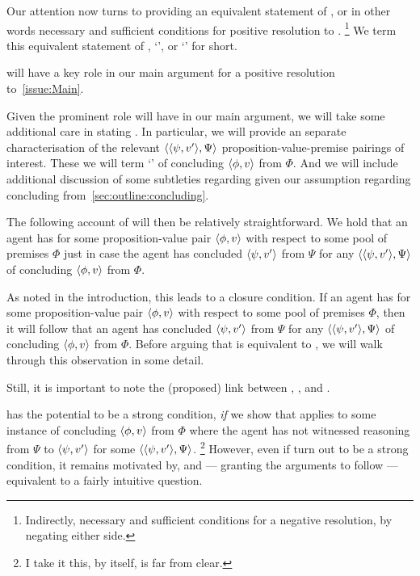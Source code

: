 \begin{note}
  Our attention now turns to providing an equivalent statement of \zs{}, or in other words necessary and sufficient conditions for positive resolution to \qzs{}.%
  \footnote{
    Indirectly, necessary and sufficient conditions for a negative resolution, by negating either side.
  }
  We term this equivalent statement of \zs{}, `\Zs{-}', or `\Zs{}' for short.

  \Zs{} will have a key role in our main argument for a positive resolution to~\autoref{issue:Main}.

  Given the prominent role \Zs{} will have in our main argument, we will take some additional care in stating \Zs{}.
  In particular, we will provide an separate characterisation of the relevant \(\langle \langle \psi, v' \rangle, \Psi \rangle\) proposition-value-premise pairings of interest.
  These we will term `' of concluding \(\langle \phi, v \rangle\) from \(\Phi\).
  And we will include additional discussion of some subtleties regarding  given our assumption regarding concluding from~\autoref{sec:outline:concluding}.

  The following account of \Zs{} will then be relatively straightforward.
  We hold that an agent has \Zs{} for some proposition-value pair \(\langle \phi, v \rangle\) with respect to some pool of premises \(\Phi\) just in case the agent has concluded \(\langle \psi, v' \rangle\) from \(\Psi\) for any \requ{} \(\langle \langle \psi, v' \rangle, \Psi \rangle\) of concluding \(\langle \phi, v \rangle\) from \(\Phi\).

  As noted in the introduction, this leads to a closure condition.
  If an agent has \Zs{} for some proposition-value pair \(\langle \phi, v \rangle\) with respect to some pool of premises \(\Phi\), then it will follow that an agent has concluded \(\langle \psi, v' \rangle\) from \(\Psi\) for any \requ{} \(\langle \langle \psi, v' \rangle, \Psi \rangle\) of concluding \(\langle \phi, v \rangle\) from \(\Phi\).
  Before arguing that \Zs{} is equivalent to \zs{}, we will walk through this observation in some detail.
\end{note}

\begin{note}
  Still, it is important to note the (proposed) link between \qzs{}, \zs{}, and \Zs{}.

  \Zs{} has the potential to be a strong condition, \emph{if} we show that \Zs{} applies to some instance of concluding \(\langle \phi, v \rangle\) from \(\Phi\) where the agent has not witnessed reasoning from \(\Psi\) to \(\langle \psi, v' \rangle\) for some \requ{} \(\langle \langle \psi, v' \rangle, \Psi \rangle\).%
  \footnote{
    I take it this, by itself, is far from clear.
  }
  However, even if \Zs{} turn out to be a strong condition, it remains motivated by, and --- granting the arguments to follow --- equivalent to a fairly intuitive question.
\end{note}

